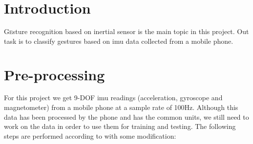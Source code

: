 \documentclass[twoside]{article}
\begin{document}
\begin{multicols}{2} %

\section{Introduction}
\lettrine[nindent=0em,lines=2]{G}esture recognition based on inertial sensor is the main topic in this project. Out task is to classify gestures based on imu data collected from a mobile phone.


\section{Pre-processing}

For this project we get 9-DOF imu readings (acceleration, gyroscope and magnetometer) from a mobile phone at a sample rate of 100Hz. Although this data has been processed by the phone and has the common units, we still need to work on the data in order to use them for training and testing. The following steps are performed according to \cite{Vesa00} with some modification:


\end{multicols}
\end{document}
